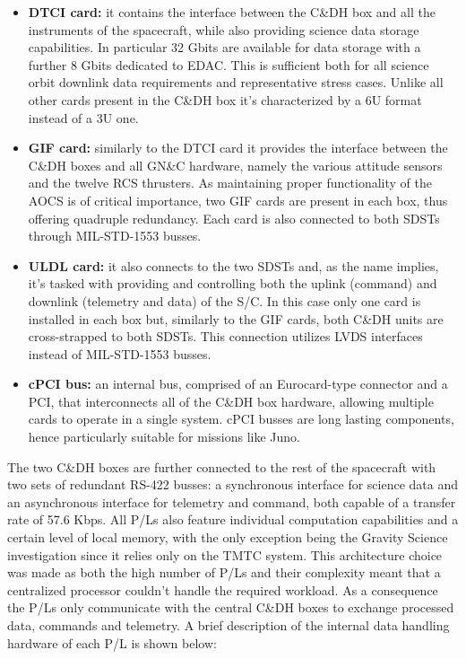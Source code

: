 \begin{itemize}
    \item \textbf{DTCI card:} it contains the interface between the C\&DH box and all the instruments of the spacecraft, while also providing science data storage capabilities. In particular 32 Gbits are available for data storage with a further 8 Gbits dedicated to EDAC. This is sufficient both for all science orbit downlink data requirements and representative stress cases. Unlike all other cards present in the C\&DH box it's characterized by a 6U format instead of a 3U one. \cite{juno_sito}
    \item \textbf{GIF card:} similarly to the DTCI card it provides the interface between the C\&DH boxes and all GN\&C hardware, namely the various attitude sensors and the twelve RCS thrusters. As maintaining proper functionality of the AOCS is of critical importance, two GIF cards are present in each box, thus offering quadruple redundancy. Each card is also connected to both SDSTs through MIL-STD-1553 \cite{MIL-STD-1553} busses. \cite{juno_telecommunication}   
    \item \textbf{ULDL card:} it also connects to the two SDSTs and, as the name implies, it's tasked with providing and controlling both the uplink (command) and downlink (telemetry and data) of the S/C. In this case only one card is installed in each box but, similarly to the GIF cards, both C\&DH units are cross-strapped to both SDSTs. This connection utilizes LVDS interfaces instead of MIL-STD-1553 busses. \cite{juno_telecommunication}
    \item \textbf{cPCI bus:} an internal bus, comprised of an Eurocard-type connector and a PCI, that interconnects all of the C\&DH box hardware, allowing multiple cards to operate in a single system. cPCI busses are long lasting components, hence particularly suitable for missions like Juno.
    

\end{itemize}
The two C\&DH boxes are further connected to the rest of the spacecraft with two sets of redundant RS-422 busses: a synchronous interface for science data  and an asynchronous interface for telemetry and command, both capable of a transfer rate of 57.6 Kbps. \cite{UVS_info} \cite{MWR_info} 
All P/Ls also feature individual computation capabilities and a certain level of local memory, with the only exception being the Gravity Science investigation since it relies only on the TMTC system. This architecture choice was made as both the high number of P/Ls and their complexity meant that a centralized processor couldn't handle the required workload. As a consequence the P/Ls only communicate with the central C\&DH boxes to exchange processed data, commands and telemetry. A brief description of the internal data handling hardware of each P/L is shown below:
